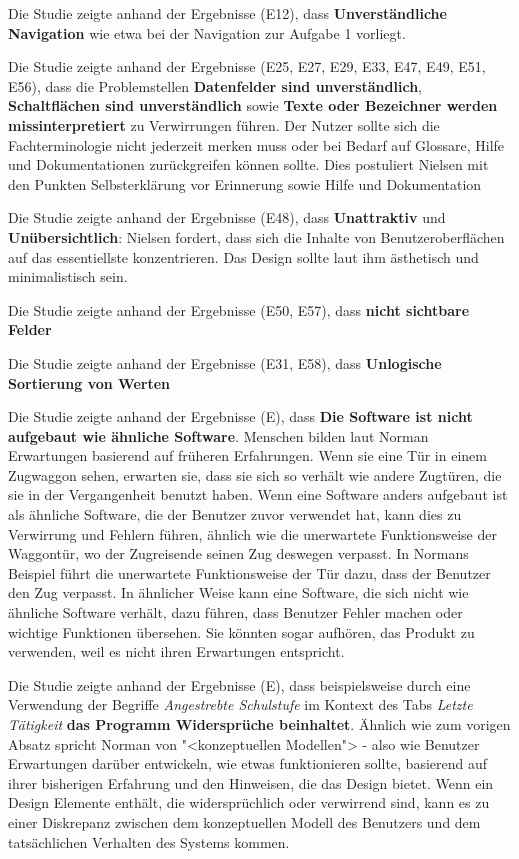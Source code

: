 Die Studie zeigte anhand der Ergebnisse (E12), dass \textbf{Unverständliche Navigation} wie etwa bei der Navigation zur Aufgabe 1 vorliegt.

Die Studie zeigte anhand der Ergebnisse (E25, E27, E29, E33, E47, E49, E51, E56), dass die Problemstellen \textbf{Datenfelder sind unverständlich}, \textbf{Schaltflächen sind unverständlich} sowie \textbf{Texte oder Bezeichner werden missinterpretiert} zu Verwirrungen führen. Der Nutzer sollte sich die Fachterminologie nicht jederzeit merken muss oder bei Bedarf auf Glossare, Hilfe und Dokumentationen zurückgreifen können sollte. Dies postuliert Nielsen mit den Punkten \glqq Selbsterklärung vor Erinnerung\grqq{} sowie \glqq Hilfe und Dokumentation\grqq{} \cite{Nielsen10}

Die Studie zeigte anhand der Ergebnisse (E48), dass \textbf{Unattraktiv} und \textbf{Unübersichtlich}: Nielsen fordert, dass sich die Inhalte von Benutzeroberflächen auf das essentiellste konzentrieren. Das Design sollte laut ihm ästhetisch und minimalistisch sein. \cite{Nielsen10}

Die Studie zeigte anhand der Ergebnisse (E50, E57), dass \textbf{nicht sichtbare Felder}

Die Studie zeigte anhand der Ergebnisse (E31, E58), dass \textbf{Unlogische Sortierung von Werten}

Die Studie zeigte anhand der Ergebnisse (E), dass \textbf{Die Software ist nicht aufgebaut wie ähnliche Software}. Menschen bilden laut Norman Erwartungen basierend auf früheren Erfahrungen. Wenn sie eine Tür in einem Zugwaggon sehen, erwarten sie, dass sie sich so verhält wie andere Zugtüren, die sie in der Vergangenheit benutzt haben. Wenn eine Software anders aufgebaut ist als ähnliche Software, die der Benutzer zuvor verwendet hat, kann dies zu Verwirrung und Fehlern führen, ähnlich wie die unerwartete Funktionsweise der Waggontür, wo der Zugreisende seinen Zug deswegen verpasst. In Normans Beispiel führt die unerwartete Funktionsweise der Tür dazu, dass der Benutzer den Zug verpasst. In ähnlicher Weise kann eine Software, die sich nicht wie ähnliche Software verhält, dazu führen, dass Benutzer Fehler machen oder wichtige Funktionen übersehen. Sie könnten sogar aufhören, das Produkt zu verwenden, weil es nicht ihren Erwartungen entspricht.\cite{Norman}

Die Studie zeigte anhand der Ergebnisse (E), dass beispielsweise durch eine Verwendung der Begriffe \textit{Angestrebte Schulstufe} im Kontext des Tabs \textit{Letzte Tätigkeit} \textbf{das Programm Widersprüche beinhaltet}. Ähnlich wie zum vorigen Absatz spricht Norman von "<konzeptuellen Modellen"> - also wie Benutzer Erwartungen darüber entwickeln, wie etwas funktionieren sollte, basierend auf ihrer bisherigen Erfahrung und den Hinweisen, die das Design bietet. Wenn ein Design Elemente enthält, die widersprüchlich oder verwirrend sind, kann es zu einer Diskrepanz zwischen dem konzeptuellen Modell des Benutzers und dem tatsächlichen Verhalten des Systems kommen. 


